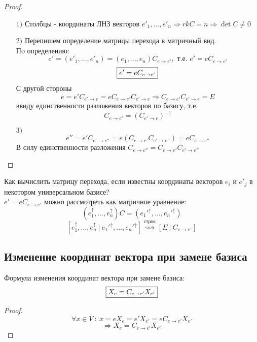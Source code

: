   \begin{proof}\tab
    \begin{itemize}
      \item[$1)$] Столбцы - координаты ЛНЗ векторов $e'_1,...,e'_n \Longrightarrow rkC = n \Longrightarrow \det C \neq 0$
      \item[$2)$] Перепишем определение матрицы перехода в матричный вид. \\
      По определению: 
      $$e'=(e'_1,...,e'_n) = (e_1,...,e_n)C_{e \to e'}, \text{ т.е. } e' = eC_{e \to e'}$$
      \begin{equation}
        \fbox{$e' = eC_{e \to e'}$}
      \end{equation}
      С другой стороны 
      $$e = e'C_{e' \to e} = eC_{e \to e'}C_{e' \to e} \Longrightarrow C_{e \to e'}C_{e' \to e} = E$$ 
      ввиду единственности разложения векторов по базису, т.е. 
      $$C_{e \to e'} = (C_{e' \to e})^{-1}$$
      \item[$3)$] $$e'' = e'C_{e' \to e''} = e(C_{e \to e'}C_{e' \to e''}) = eC_{e \to e''}$$
      В силу единственности разложения $C_{e \to e''} = C_{e \to e'}C_{e' \to e''}$     
    \end{itemize}
  \end{proof} 
  \begin{algorithm}
    Как вычислить матрицу перехода, если известны координаты векторов $e_i$ и $e'_j$ в некотором универсальном базисе?\\
    $e' = eC_{e \to e'}$ можно рассмотреть как матричное уравнение:
    $$(e_1^{\uparrow},...,e_n^{\uparrow})C = ({e_1'}^{\uparrow},...,{e_n'}^{\uparrow})$$
    $$[e_1^{\uparrow},...,e_n^{\uparrow} \ | \ {e_1'}^{\uparrow},...,{e_n'}^{\uparrow}] \overset{\text{строк}}{\rightsquigarrow} [E \ | \ C_{e \to e'}]$$   
  \end{algorithm}
  \subsection{Изменение координат вектора при замене базиса}
  \begin{theorem}
    Формула изменения координат вектора при замене базиса:
    \begin{equation}
      \fbox{$X_e = C_{e \to e'}X_{e'}$} 
    \end{equation}
  \end{theorem} 
  \begin{proof}
    $$\forall x \in V \ : \ x = eX_e = e'X_{e'} = eC_{e \to e'}X_{e'}$$
    $$\Longrightarrow  X_e = C_{e \to e'}X_{e'}$$ 
  \end{proof}
